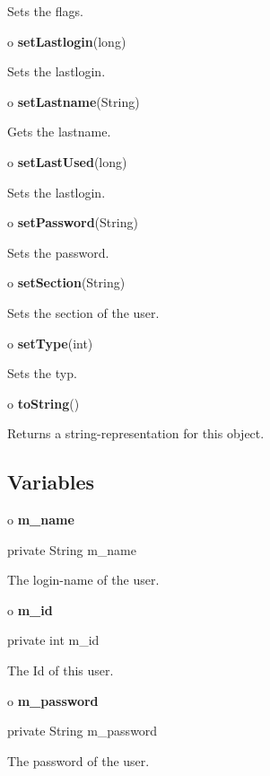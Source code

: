 \begin{description}
Sets the flags.  
\item o {\bf setLastlogin}(long)  

Sets the lastlogin.  
\item o {\bf setLastname}(String)  

Gets the lastname.  
\item o {\bf setLastUsed}(long)  

Sets the lastlogin.  
\item o {\bf setPassword}(String)  

Sets the password.  
\item o {\bf setSection}(String)  

Sets the section of the user.  
\item o {\bf setType}(int)  

Sets the typ.  
\item o {\bf toString}()  

Returns a string-representation for this object. 
\end{description}

\subsection*{  Variables }

o {\bf m\_name} 

\begin{PRE}
 private String m\_name
\end{PRE}

\begin{description}
\htmlDD The login-name of the user.

\end{description}

o {\bf m\_id} 

\begin{PRE}
 private int m\_id
\end{PRE}

\begin{description}
\htmlDD The Id of this user.

\end{description}

o {\bf m\_password} 

\begin{PRE}
 private String m\_password
\end{PRE}

\begin{description}
\htmlDD The password of the user.

\end{description}

